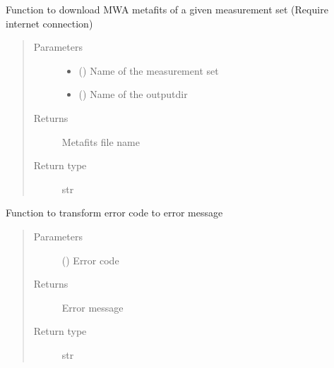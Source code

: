 \documentclass[letterpaper,10pt,english]{sphinxmanual}
\begin{document}

\begin{fulllineitems}
\label{\detokenize{paircars:paircars.basic_func.download_metafits}}
\sphinxAtStartPar
Function to download MWA metafits of a given measurement set (Require internet connection)
\begin{quote}\begin{description}
\item[{Parameters}] \leavevmode\begin{itemize}
\item {} 
\sphinxAtStartPar
{} () \textendash{} Name of the measurement set

\item {} 
\sphinxAtStartPar
{} () \textendash{} Name of the outputdir

\end{itemize}

\item[{Returns}] \leavevmode
\sphinxAtStartPar
Metafits file name

\item[{Return type}] \leavevmode
\sphinxAtStartPar
str

\end{description}\end{quote}

\end{fulllineitems}


\begin{fulllineitems}
\label{\detokenize{paircars:paircars.basic_func.error_msgs}}
\sphinxAtStartPar
Function to transform error code to error message
\begin{quote}\begin{description}
\item[{Parameters}] \leavevmode
\sphinxAtStartPar
{} () \textendash{} Error code

\item[{Returns}] \leavevmode
\sphinxAtStartPar
Error message

\item[{Return type}] \leavevmode
\sphinxAtStartPar
str

\end{description}\end{quote}

\end{fulllineitems}
\end{document}
